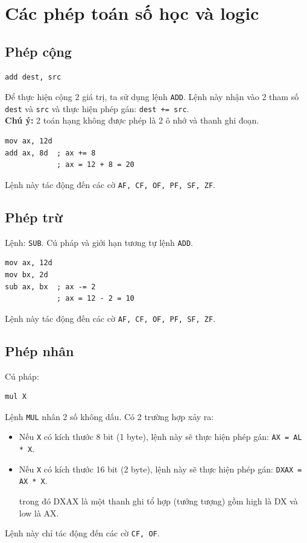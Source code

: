\documentclass[12pt]{report}
\newcommand{\code}[1]{\texttt{#1}}
\begin{document}
\section{Các phép toán số học và logic}
\subsection{Phép cộng}
\begin{verbatim}
add dest, src
\end{verbatim}
Để thực hiện cộng 2 giá trị, ta sử dụng lệnh \code{ADD}. Lệnh này nhận vào 2 tham số \code{dest} và \code{src} và thực hiện phép gán: \code{dest += src}.\\
\textbf{Chú ý:} 2 toán hạng không được phép là 2 ô nhớ và thanh ghi đoạn.
\begin{verbatim}
mov ax, 12d 
add ax, 8d  ; ax += 8
            ; ax = 12 + 8 = 20 
\end{verbatim}
Lệnh này tác động đến các cờ \code{AF, CF, OF, PF, SF, ZF}.

\subsection{Phép trừ}
Lệnh: \code{SUB}. Cú pháp và giới hạn tương tự lệnh \code{ADD}.
\begin{verbatim}
mov ax, 12d 
mov bx, 2d
sub ax, bx  ; ax -= 2
            ; ax = 12 - 2 = 10 
\end{verbatim}
Lệnh này tác động đến các cờ \code{AF, CF, OF, PF, SF, ZF}.

\subsection{Phép nhân}
Cú pháp: 
\begin{verbatim}
mul X
\end{verbatim}
Lệnh \code{MUL} nhân 2 số không dấu.
Có 2 trường hợp xảy ra:
\begin{itemize}
    \item Nếu \code{X} có kích thước 8 bit (1 byte), lệnh này sẽ thực hiện phép gán: \code{AX = AL * X}.
    \item Nếu \code{X} có kích thước 16 bit (2 byte), lệnh này sẽ thực hiện phép gán: \code{DXAX = AX * X}.
    \par trong đó DXAX là một thanh ghi tổ hợp (tưởng tượng) gồm high là DX và low là AX.
\end{itemize} 
Lệnh này chỉ tác động đến các cờ \code{CF, OF}.
\end{document}
